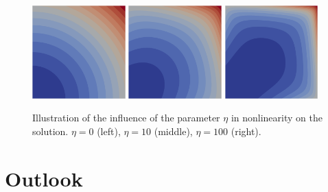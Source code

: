 \documentclass[a4paper,12pt]{article}
\begin{document}
\begin{figure}
\begin{center}
\includegraphics[width=0.32\textwidth]{eta0}\hfill
\includegraphics[width=0.32\textwidth]{eta10}\hfill
\includegraphics[width=0.32\textwidth]{eta100}
\end{center}
\caption{Illustration of the influence of the parameter $\eta$
in nonlinearity on the solution. $\eta=0$ (left), $\eta=10$ (middle), $\eta=100$ (right).}
\label{fig:1}
\end{figure}

\section{Outlook}
\end{document}

